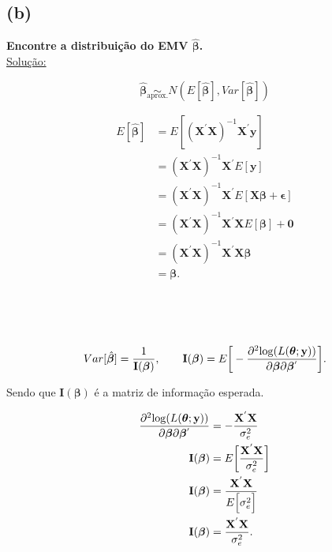 \documentclass[12pt, oldfontcommands]{article}\usepackage[]{graphicx}\usepackage[]{color}
\begin{document}
\subsection*{(b)} 

\textbf{Encontre a distribuição do EMV \(\hat{\bm{\beta}}\).} \\

\underline{Solução:}

\[ \hat{\bm{\beta}} \underset{\text{aprox.}}{\sim}
    N(E[\hat{\bm{\beta}}], Var[\hat{\bm{\beta}}]) \]

\begin{multicols}{2}
\begin{align*}
 E[\hat{\bm{\beta}}] & =
 E[(\mathbf{X}^{'}\mathbf{X})^{-1}\mathbf{X}^{'}\mathbf{y}] \\ & =
 (\mathbf{X}^{'}\mathbf{X})^{-1}\mathbf{X}^{'}E[\mathbf{y}] \\ & =
 (\mathbf{X}^{'}\mathbf{X})^{-1}\mathbf{X}^{'}
 E[\mathbf{X} \bm{\beta} + \bm{\epsilon}] \\ & =
 (\mathbf{X}^{'}\mathbf{X})^{-1}\mathbf{X}^{'}\mathbf{X}E[\bm{\beta}] +
 \mathbf{0} \\ & = (\mathbf{X}^{'}\mathbf{X})^{-1}
 \mathbf{X}^{'}\mathbf{X}\bm{\beta} \\ & = \bm{\beta}.
 \\ \\ \\ \\ \\ \\ \\ \\ \\ \\ \\
\end{align*}

\columnbreak

\[ Var[\hat{\bm{\beta}}] = \frac{1}{\mathbf{I}(\bm{\beta})}, \qquad
   \mathbf{I}(\bm{\beta}) = E\bigg[-\frac{\partial^2
   {\rm log}(L(\bm{\theta};\mathbf{y}))}{\partial \bm{\beta} \partial
   \bm{\beta}^{'}}\bigg]. \]

Sendo que \(\mathbf{I}(\bm{\beta})\) é a matriz de informação esperada.

\begin{align*}
 \frac{\partial^2 {\rm log}(L(\bm{\theta};\mathbf{y}))}{\partial
 \bm{\beta} \partial \bm{\beta}^{'}} & = -\frac{\mathbf{X}^{'}
 \mathbf{X}}{\sigma_{e}^{2}} \\ \mathbf{I}(\bm{\beta}) & =
 E\bigg[\frac{\mathbf{X}^{'}\mathbf{X}}{\sigma_{e}^{2}}\bigg] \\
 \mathbf{I}(\bm{\beta}) & = \frac{\mathbf{X}^{'}\mathbf{X}}{E\Big[
 \sigma_{e}^{2}\Big]} \\ \mathbf{I}(\bm{\beta}) & =
 \frac{\mathbf{X}^{'}\mathbf{X}}{\sigma_{e}^{2}}.
\end{align*}


\end{multicols}
\end{document}
